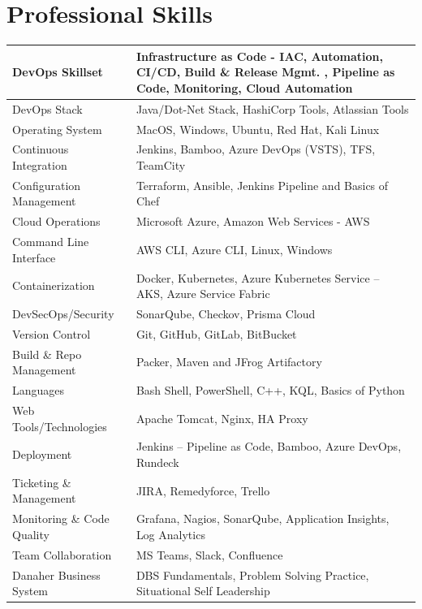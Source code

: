 \documentclass[11pt, a4paper]{article}
\begin{document}
\section*{\color{NavyBlue}Professional Skills}
\vspace{-1.5mm}
\noindent\begin{tabular}{|>{\columncolor[gray]{0.9}}p{1.8in}|p{4.7in}|}
\hline
DevOps Skillset & Infrastructure as Code - IAC, Automation, CI/CD, Build \& Release Mgmt. , Pipeline as Code, Monitoring, Cloud Automation\\
\hline
DevOps Stack & Java/Dot-Net Stack, HashiCorp Tools, Atlassian Tools \\
\hline
Operating System & MacOS, Windows, Ubuntu, Red Hat, Kali Linux \\
\hline
Continuous Integration & Jenkins, Bamboo, Azure DevOps (VSTS), TFS, TeamCity \\
\hline
Configuration Management 	& Terraform, Ansible, Jenkins Pipeline and Basics of Chef \\
\hline
Cloud Operations 	& Microsoft Azure, Amazon Web Services - AWS \\
\hline
Command Line Interface & AWS CLI, Azure CLI, Linux, Windows \\
\hline
Containerization  & Docker, Kubernetes, Azure Kubernetes Service – AKS, Azure Service Fabric \\
\hline
DevSecOps/Security & SonarQube,  Checkov, Prisma Cloud \\
\hline
Version Control & Git, GitHub, GitLab, BitBucket \\
\hline
Build \& Repo Management  & Packer, Maven and JFrog Artifactory \\
\hline
Languages	 & Bash Shell, PowerShell, C++, KQL, Basics of Python \\
\hline
Web Tools/Technologies  & Apache Tomcat, Nginx, HA Proxy \\
\hline
Deployment & Jenkins – Pipeline as Code, Bamboo, Azure DevOps, Rundeck \\
\hline
Ticketing \& Management  & JIRA, Remedyforce, Trello \\
\hline
Monitoring \& Code Quality	 & Grafana, Nagios, SonarQube, Application Insights, Log Analytics \\
\hline
Team Collaboration & MS Teams, Slack, Confluence \\
\hline
Danaher Business System &	DBS Fundamentals, Problem Solving Practice,  Situational Self Leadership\\
\hline
\end{tabular}
\end{document}
